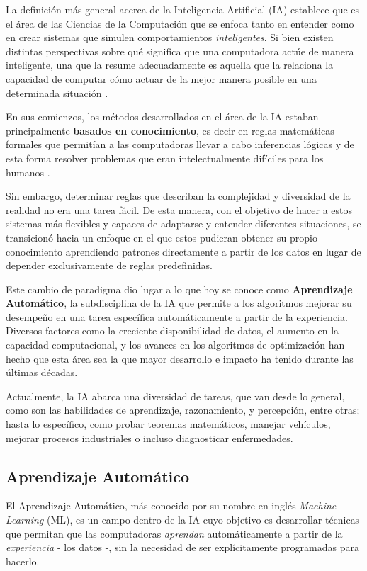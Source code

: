\documentclass[../../main.tex]{subfiles}
\begin{document}
La definición más general acerca de la Inteligencia Artificial (IA) establece que es el
área de las Ciencias de la Computación que se enfoca tanto en entender como en crear
sistemas que simulen comportamientos \textit{inteligentes}. Si bien existen distintas
perspectivas sobre qué significa que una computadora actúe de manera inteligente, una que
la resume adecuadamente es aquella que la relaciona la capacidad de computar cómo actuar
de la mejor manera posible en una determinada situación \cite{ai-a-modern-approach}.

En sus comienzos, los métodos desarrollados en el área de la IA estaban principalmente
\textbf{basados en conocimiento}, es decir en reglas matemáticas formales que permitían a las
computadoras llevar a cabo inferencias lógicas y de esta forma resolver problemas que eran
intelectualmente difíciles para los humanos \cite{deep-learning}.

Sin embargo, determinar reglas que describan la complejidad y diversidad de la realidad no
era una tarea fácil. De esta manera, con el objetivo de hacer a estos sistemas más
flexibles y capaces de adaptarse y entender diferentes situaciones, se transicionó hacia
un enfoque en el que estos pudieran obtener su propio conocimiento aprendiendo patrones
directamente a partir de los datos en lugar de depender exclusivamente de reglas
predefinidas.

Este cambio de paradigma dio lugar a lo que hoy se conoce como \textbf{Aprendizaje
Automático}, la subdisciplina de la IA que permite a los algoritmos mejorar su desempeño
en una tarea específica automáticamente a partir de la experiencia. Diversos factores como
la creciente disponibilidad de datos, el aumento en la capacidad computacional, y los
avances en los algoritmos de optimización \cite{deep-learning} han hecho que esta área sea
la que mayor desarrollo e impacto ha tenido durante las últimas décadas.

Actualmente, la IA abarca una diversidad de tareas, que van desde lo general, como son las
habilidades de aprendizaje, razonamiento, y percepción, entre otras; hasta lo específico,
como probar teoremas matemáticos, manejar vehículos, mejorar procesos industriales o
incluso diagnosticar enfermedades.

\subsection{Aprendizaje Automático}
El Aprendizaje Automático, más conocido por su nombre en inglés \textit{Machine Learning}
(ML), es un campo dentro de la IA cuyo objetivo es desarrollar técnicas que permitan que
las computadoras \textit{aprendan} automáticamente a partir de la \textit{experiencia} -
los datos -, sin la necesidad de ser explícitamente programadas para hacerlo.
\end{document}
